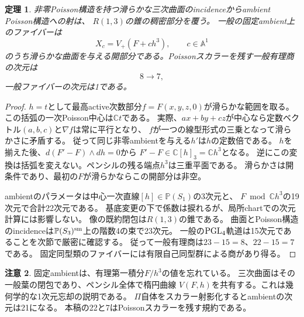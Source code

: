 \documentclass[11pt,a4paper]{ltjsarticle}
\newtheorem{theorem}{定理}[section]
\theoremstyle{definition}\newtheorem{remark}[theorem]{注意}
\newcommand{\PP}{\mathbb P}\newcommand{\kk}{\mathbb C}
\begin{document}
\begin{theorem}\label{thm:poisson-fiber}
非零Poisson構造を持つ滑らかな三次曲面のincidenceからambient Poisson構造への射は、
$R(1,3)$の錐の稠密部分を覆う。
一般の固定ambient上のファイバーは
\[
 X_c=V_+(F+c h^3),\qquad c\in\mathbb A^1
\]
のうち滑らかな曲面を与える開部分である。Poissonスカラーを残す一般有理商の次元は
\[
 8\longrightarrow7,
\]
一般ファイバーの次元は1である。
\end{theorem}
\begin{proof}
$h=t$として最高active次数部分$f=F(x,y,z,0)$が滑らかな範囲を取る。
この括弧の一次Poisson中心は$\kk t$である。
実際、$a x+b y+c z$が中心なら定数ベクトル$(a,b,c)$と$\nabla f$は常に平行となり、
$f$が一つの線型形式の三乗となって滑らかさに矛盾する。
従って同じ非零ambientを与える$h'$は$h$の定数倍である。
$h$を揃えた後、$d(F'-F)\wedge dh=0$から
$F'-F\in\kk[h]_3=\kk h^3$となる。
逆にこの変換は括弧を変えない。ペンシルの残る端点$h^3$は三重平面である。
滑らかさは開条件であり、最初の$F$が滑らかならこの開部分は非空。

ambientのパラメータは中心一次直線$[h]\in\PP(S_1)$の3次元と、
$F\bmod\kk h^3$の19次元で合計22次元である。
基底変更の下で係数は捩れるが、局所chartでの次元計算には影響しない。
像の既約閉包は$R(1,3)$の錐である\cite[\S3.4]{Pym}。
曲面とPoisson構造のincidenceは$\PP(S_3)^{\rm sm}$上の階数4の束で23次元。
一般の$\operatorname{PGL}_4$軌道は15次元であることを次節で厳密に確認する。
従って一般有理商は$23-15=8$、$22-15=7$である。
固定同型類のファイバーには有限自己同型群による商があり得る。
\end{proof}

\begin{remark}
固定ambientは、有理第一積分$F/h^3$の値を忘れている。
三次曲面はその一般葉の閉包であり、ペンシル全体で楕円曲線
$V(F,h)$を共有する。これは幾何学的な1次元忘却の説明である。
$\Pi$自体をスカラー射影化するとambientの次元は21になる。
本稿の22と7はPoissonスカラーを残す規約である。
\end{remark}
\end{document}
